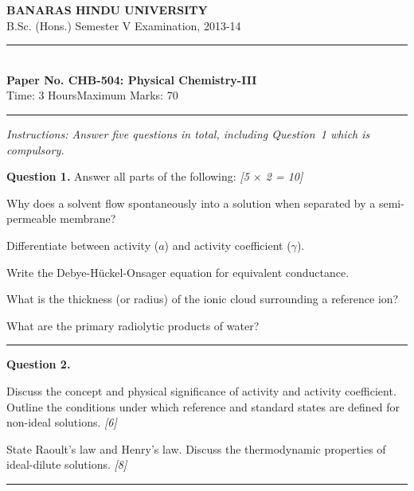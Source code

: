 \documentclass[11pt,a4paper]{article}
\newcommand{\pts}[1]{\hfill   \textit{[#1]}}
\begin{document}
\begin{center}
  {\large\bfseries BANARAS HINDU UNIVERSITY}\\[2pt]
  {\normalsize B.Sc. (Hons.) Semester V Examination, 2013-14}\\[6pt]
  \rule{0.8\linewidth}{0.5pt}\\[6pt]
  {\large\bfseries Paper No. CHB-504: Physical Chemistry-III}\\[4pt]
  {\normalsize Time: 3 Hours\hfill Maximum Marks: 70}
\end{center}
\rule{\linewidth}{0.4pt}
\small



\noindent   \textit{Instructions: Answer five questions in total, including Question~1 which is compulsory.}

\normalsize
\bigskip




\noindent   \textbf{Question 1.} Answer all parts of the following: \pts{5 $ \times$ 2 = 10}

\begin{parts}
  \item Why does a solvent flow spontaneously into a solution when separated by a semi-permeable membrane?
  \item Differentiate between activity ($a$) and activity coefficient ($\gamma$).
  \item Write the Debye-H\"uckel-Onsager equation for equivalent conductance.
  \item What is the thickness (or radius) of the ionic cloud surrounding a reference ion?
  \item What are the primary radiolytic products of water?
\end{parts}

\medskip\rule{\linewidth}{0.2pt}




\noindent   \textbf{Question 2.}

\begin{parts}
  \item Discuss the concept and physical significance of activity and activity coefficient. Outline the conditions under which reference and standard states are defined for non-ideal solutions. \pts{6}
  \item State Raoult's law and Henry's law. Discuss the thermodynamic properties of ideal-dilute solutions. \pts{8}
\end{parts}

\medskip\rule{\linewidth}{0.2pt}
\end{document}
